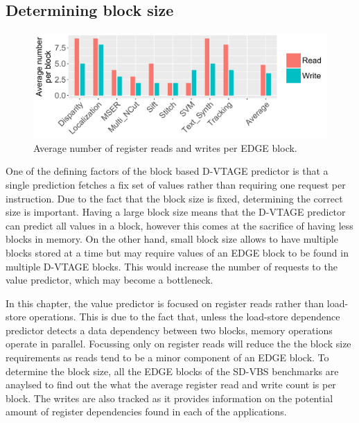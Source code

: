 
\subsection{Determining block size}


\begin{figure}[t]
    \centering
    \includegraphics[width=1\textwidth]{chapter3/graphics/averageRegRead.pdf}

    \caption{Average number of register reads and writes per EDGE block.}
    \label{fig:edge_reg_read}
	\vspace{1em}
\end{figure}
One of the defining factors of the block based D-VTAGE predictor is that a single prediction fetches a fix set of values rather than requiring one request per instruction.
Due to the fact that the block size is fixed, determining the correct size is important.
Having a large block size means that the D-VTAGE predictor can predict all values in a block, however this comes at the sacrifice of having less blocks in memory.
On the other hand, small block size allows to have multiple blocks stored at a time but may require values of an EDGE block to be found in multiple D-VTAGE blocks.
This would increase the number of requests to the value predictor, which may become a bottleneck.

In this chapter, the value predictor is focused on register reads rather than load-store operations.
This is due to the fact that, unless the load-store dependence predictor detects a data dependency between two blocks, memory operations operate in parallel.
Focussing only on register reads will reduce the the block size requirements as reads tend to be a minor component of an EDGE block.
To determine the block size, all the EDGE blocks of the SD-VBS benchmarks are anaylsed to find out the what the average register read and write count is per block.
The writes are also tracked as it provides information on the potential amount of register dependencies found in each of the applications.

